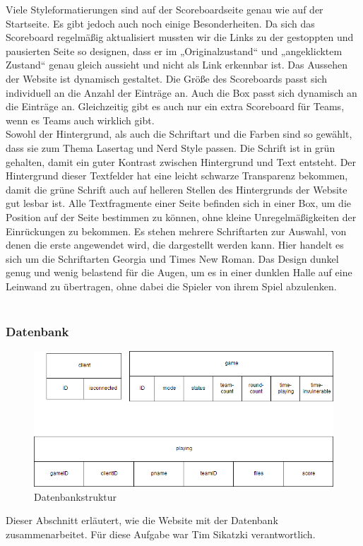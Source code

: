 Viele Styleformatierungen sind auf der Scoreboardseite genau wie auf der Startseite. Es gibt jedoch auch noch einige Besonderheiten. Da sich das Scoreboard regelmäßig aktualisiert mussten wir die Links zu der gestoppten und pausierten Seite so designen, dass er im „Originalzustand“ und „angeklicktem Zustand“ genau gleich aussieht und nicht als Link erkennbar ist.
Das Aussehen der Website ist  dynamisch gestaltet. Die Größe des Scoreboards passt sich individuell an die Anzahl der Einträge an. Auch die Box passt sich dynamisch an die Einträge an. Gleichzeitig gibt es auch nur ein extra Scoreboard für Teams, wenn es Teams auch wirklich gibt.\\ Sowohl der Hintergrund, als auch die Schriftart und die Farben sind so gewählt, dass sie zum Thema Lasertag und Nerd Style passen. 
Die Schrift ist in grün gehalten, damit ein guter Kontrast zwischen Hintergrund und Text entsteht. Der Hintergrund dieser Textfelder hat eine leicht schwarze Transparenz bekommen, damit die grüne Schrift auch auf helleren Stellen des Hintergrunds der Website gut lesbar ist. Alle Textfragmente einer Seite befinden sich in einer Box, um die Position auf der Seite bestimmen zu können, ohne kleine Unregelmäßigkeiten der Einrückungen zu bekommen. Es stehen mehrere Schriftarten zur Auswahl, von denen die erste angewendet wird, die dargestellt werden kann. Hier handelt es sich um die Schriftarten Georgia und Times New Roman. Das Design dunkel genug und wenig belastend für die Augen, um es in einer dunklen Halle auf eine Leinwand zu übertragen, ohne dabei die Spieler von ihrem Spiel abzulenken. \\\\


\subsubsection{Datenbank}
\begin{figure}[htb]
	\begin{center}
		\includegraphics[width=0.8 \textwidth]{Databasestrucb.png}
		\caption{Datenbankstruktur}
		\label{fig:database}
	\end{center}
\end{figure}
Dieser Abschnitt erläutert, wie die Website mit der Datenbank zusammenarbeitet. Für diese Aufgabe war Tim Sikatzki verantwortlich.

